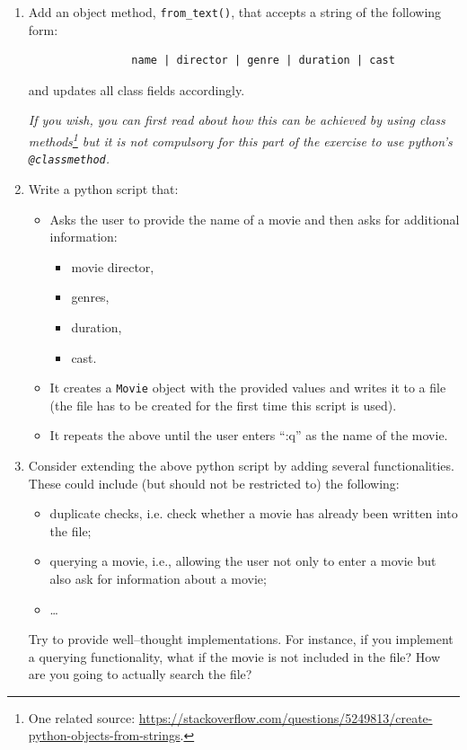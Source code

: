 \documentclass[a4paper, 11pt]{article}
\theoremstyle{definition}
\begin{document}
\begin{enumerate}[label = E\arabic*.]
\begin{enumerate}
			\begin{verbatim}
				A Christmas Carol | Rober Zemeckis | Animation,
				Adventure, Comedy | 126 | Jim Carrey, Garry Oldman,
				Colin Firth
			\end{verbatim}
			\item Add an object method, \texttt{from\_text()}, that accepts a string of the following form:
			\begin{verbatim}
				name | director | genre | duration | cast
			\end{verbatim}
			and updates all class fields accordingly.
			
			\textit{If you wish, you can first read about how this can be achieved by using class methods\footnote{One related source: \href{https://stackoverflow.com/questions/5249813/create-python-objects-from-strings}{https://stackoverflow.com/questions/5249813/create-python-objects-from-strings}.} but it is not compulsory for this part of the exercise to use python's \texttt{@classmethod}.}
			\item Write a python script that:
			\begin{itemize}
				\item Asks the user to provide the name of a movie and then asks for additional information:
					\begin{itemize}
						\item movie director,
						\item genres,
						\item duration,
						\item cast.
					\end{itemize}
				\item It creates a \texttt{Movie} object with the provided values and writes it to a file (the file has to be created for the first time this script is used).
				\item It repeats the above until the user enters ``:q'' as the name of the movie.
			\end{itemize}
			\item Consider extending the above python script by adding several functionalities. These could include (but should not be restricted to) the following:
			\begin{itemize}
				\item duplicate checks, i.e. check whether a movie has already been written into the file;
				\item querying a movie, i.e., allowing the user not only to enter a movie but also ask for information about a movie;
				\item \ldots
			\end{itemize}
			Try to provide well--thought implementations. For instance, if you implement a querying functionality, what if the movie is not included in the file? How are you going to actually search the file?
		\end{enumerate}
	\end{enumerate}
\end{document}
